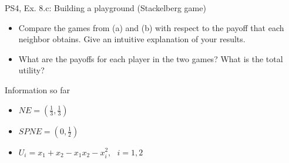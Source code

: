 \begin{frame}{PS4, Ex. 8.c: Building a playground (Stackelberg game)}
    \begin{itemize}
    \item[(c)] Compare the games from (a) and (b) with respect to the payoff that each neighbor obtains. Give an intuitive explanation of your results.
    \end{itemize}
    \vfill\null
  \begin{multicols}{2}
    \begin{itemize}
      \item[(Step 1)] What are the payoffs for each player in the two games? What is the total utility?
    \end{itemize}
    \vfill\null \columnbreak
    Information so far
    \begin{itemize}
      \item[G1] \begin{math}NE=\left(\frac{1}{3},\frac{1}{3}\right)\end{math}
      \item[G2] \begin{math}SPNE=\left(0,\frac{1}{2}\right)\end{math}
      \item[Utility] \begin{math}U_i=x_1+x_2-x_1x_2-x_i^2,\ \ \ i=1,2  \end{math}
    \end{itemize}
    \vfill\null
  \end{multicols}
\end{frame}
